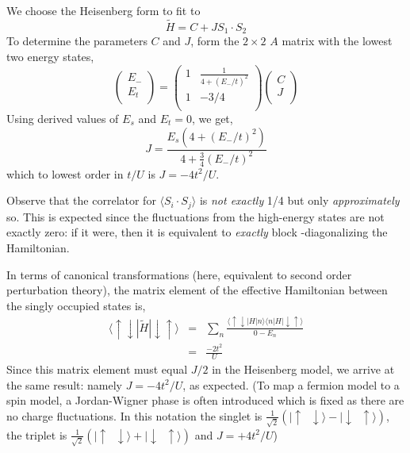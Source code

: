 \documentclass[aip,jcp,twocolumn,10pt]{revtex4-1}
\begin{document}
We choose the Heisenberg form to fit to
\begin{equation}
	\tilde{H} = C + J S_1 \cdot S_2
\end{equation}
To determine the parameters $C$ and $J$, form the $2 \times 2$ $A$ matrix 
with the lowest two energy states,
\begin{equation}
\left(
\begin{array}{c}
 E_{-} \\ 
 E_t \\
\end{array}
\right)
=
\left(
\begin{array}{cc}
1   &  \frac{1} {4+(E_{-}/t)^2}	\\
1   & -3/4                      \\
\end{array}
\right)
\left(
\begin{array}{c}
 C \\
 J \\
\end{array}
\right)
\end{equation}
Using derived values of $E_s$ and $E_t=0$, we get,
\begin{equation}
	J = \frac{E_s (4+(E_{-}/t)^2)}{4+\frac{3}{4}(E_{-}/t)^2}
\end{equation} 
which to lowest order in $t/U$ is $J = -4t^2/U$.

Observe that the correlator for $\langle S_i \cdot S_j \rangle$ is \emph{not exactly} 1/4 
but only \emph{approximately} so. This is expected since the fluctuations from the 
high-energy states are not exactly zero: if it were, then it is equivalent to 
\emph{exactly} block -diagonalizing the Hamiltonian.

In terms of canonical transformations (here, equivalent to second order perturbation theory), 
the matrix element of the effective Hamiltonian between the singly occupied states is, 
\begin{eqnarray}
	\langle \uparrow\downarrow | \tilde{H} | \downarrow \uparrow \rangle &=& \sum_{n} \frac{ \langle \uparrow\downarrow|H| n\rangle\langle n |H| \downarrow \uparrow \rangle } {0-E_n} \nonumber \\ 
	                                                                     &=& \frac{-2 t^{2}}{U}
\end{eqnarray}
Since this matrix element must equal $J/2$ in the Heisenberg model, we arrive at the same result: 
namely $J = -4t^{2}/U $, as expected.
(To map a fermion model to a spin model, a Jordan-Wigner phase is often introduced 
which is fixed as there are no charge fluctuations. In this notation the singlet is 
$ \frac{1}{\sqrt{2}} \left( |\uparrow \;\; \downarrow \rangle - |\downarrow \;\; \uparrow \rangle \right) $, 
the triplet is $ \frac{1}{\sqrt{2}} \left( |\uparrow \;\; \downarrow \rangle + |\downarrow \;\; \uparrow \rangle \right) $ 
and $J=+4t^2/U$)
\end{document}
